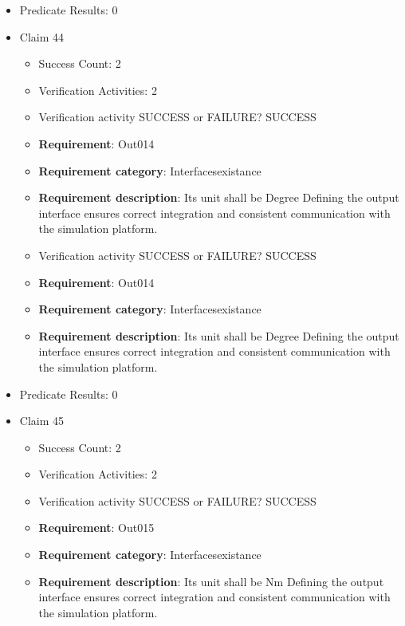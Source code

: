 \documentclass{article}
\begin{document}
\begin{itemize}
\begin{itemize}
				\end{itemize}
				
									    
				\item Predicate Results: 0

  				  \item Claim 44
				\begin{itemize}
			    	\item Success Count: 2 
			    	\item Verification Activities: 2
					\item Verification activity SUCCESS or FAILURE? SUCCESS
		
						\item \textbf{Requirement}: Out014 
						\item \textbf{Requirement category}: Interfacesexistance 
						\item \textbf{Requirement description}: Its unit shall be Degree Defining the output interface ensures correct integration and consistent communication with the simulation platform.
					
					\item Verification activity SUCCESS or FAILURE? SUCCESS
		
						\item \textbf{Requirement}: Out014 
						\item \textbf{Requirement category}: Interfacesexistance 
						\item \textbf{Requirement description}: Its unit shall be Degree Defining the output interface ensures correct integration and consistent communication with the simulation platform.
					
				\end{itemize}
				
									    
				\item Predicate Results: 0

  				  \item Claim 45
				\begin{itemize}
			    	\item Success Count: 2 
			    	\item Verification Activities: 2
					\item Verification activity SUCCESS or FAILURE? SUCCESS
		
						\item \textbf{Requirement}: Out015 
						\item \textbf{Requirement category}: Interfacesexistance 
						\item \textbf{Requirement description}: Its unit shall be Nm Defining the output interface ensures correct integration and consistent communication with the simulation platform.
					

\end{itemize}
\end{itemize}
\end{document}
